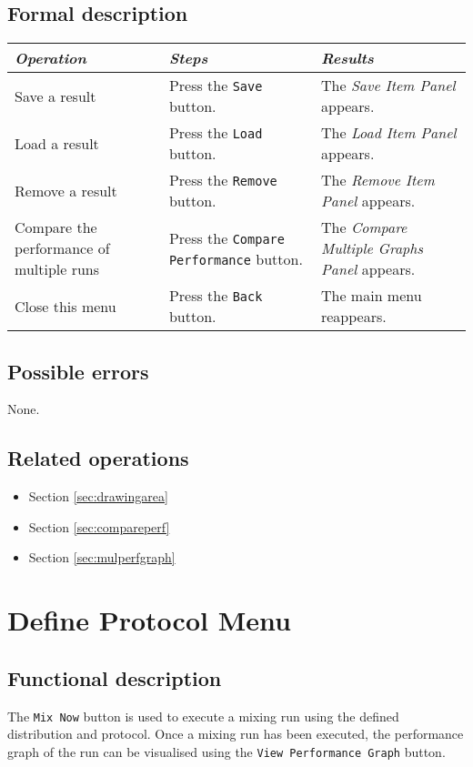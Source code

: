   \subsection*{Formal description}
  \begin{tabularx}{\textwidth}{XXX}
    \toprule
    \emph{Operation} & \emph{Steps} & \emph{Results} \\
    \midrule
    Save a result & Press the \texttt{Save} button. & The \emph{Save Item Panel} appears. \\
    \midrule
    Load a result & Press the \texttt{Load} button. & The \emph{Load Item Panel} appears. \\
    \midrule
    Remove a result & Press the \texttt{Remove} button. & The \emph{Remove Item Panel} appears. \\
    \midrule
    Compare the performance of multiple runs & Press the \texttt{Compare Performance} button. & The \emph{Compare Multiple Graphs Panel} appears. \\
    \midrule
    Close this menu & Press the \texttt{Back} button. & The main menu reappears. \\
    \bottomrule
  \end{tabularx}

  \subsection*{Possible errors}
  None.
  
  \subsection*{Related operations}
  \begin{itemize}
    \item Section \ref{sec:drawingarea}
    \item Section \ref{sec:compareperf}
    \item Section \ref{sec:mulperfgraph}
  \end{itemize}

\section{Define Protocol Menu}\label{sec:defprot}
  \subsection*{Functional description}
  The \texttt{Mix Now} button is used to execute a mixing run using the defined distribution and protocol. Once a mixing run has been executed, the performance graph of the run can be visualised using the \texttt{View Performance Graph} button.
  
